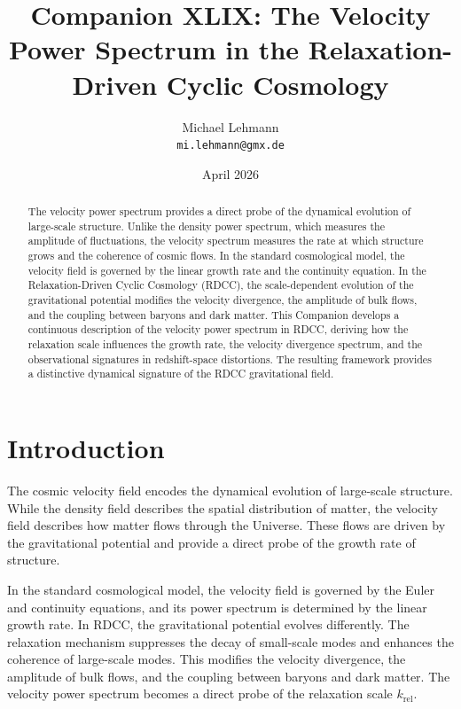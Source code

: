 \documentclass[11pt,a4paper]{article}
\title{\textbf{Companion XLIX: The Velocity Power Spectrum in the Relaxation-Driven Cyclic Cosmology}}
\author{Michael Lehmann \\ \texttt{mi.lehmann@gmx.de}}
\date{April 2026}
\begin{document}
\maketitle

\begin{abstract}
The velocity power spectrum provides a direct probe of the dynamical evolution of 
large-scale structure. Unlike the density power spectrum, which measures the 
amplitude of fluctuations, the velocity spectrum measures the rate at which 
structure grows and the coherence of cosmic flows. In the standard cosmological 
model, the velocity field is governed by the linear growth rate and the continuity 
equation. In the Relaxation-Driven Cyclic Cosmology (RDCC), the scale-dependent 
evolution of the gravitational potential modifies the velocity divergence, the 
amplitude of bulk flows, and the coupling between baryons and dark matter. This 
Companion develops a continuous description of the velocity power spectrum in RDCC, 
deriving how the relaxation scale influences the growth rate, the velocity 
divergence spectrum, and the observational signatures in redshift-space 
distortions. The resulting framework provides a distinctive dynamical signature of 
the RDCC gravitational field.
\end{abstract}
\section{Introduction}

The cosmic velocity field encodes the dynamical evolution of large-scale structure. 
While the density field describes the spatial distribution of matter, the velocity 
field describes how matter flows through the Universe. These flows are driven by 
the gravitational potential and provide a direct probe of the growth rate of 
structure.

In the standard cosmological model, the velocity field is governed by the Euler and 
continuity equations, and its power spectrum is determined by the linear growth 
rate. In RDCC, the gravitational potential evolves differently. The relaxation 
mechanism suppresses the decay of small-scale modes and enhances the coherence of 
large-scale modes. This modifies the velocity divergence, the amplitude of bulk 
flows, and the coupling between baryons and dark matter. The velocity power 
spectrum becomes a direct probe of the relaxation scale $k_{\mathrm{rel}}$.
\end{document}
